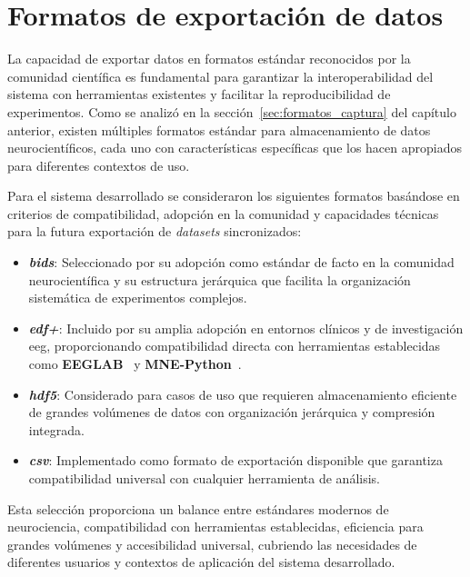 \section{Formatos de exportación de datos}
\label{sec:formatos_exportacion}

La capacidad de exportar datos en formatos estándar reconocidos por la comunidad científica es fundamental para garantizar la interoperabilidad del sistema con herramientas existentes y facilitar la reproducibilidad de experimentos. Como se analizó en la sección~\ref{sec:formatos_captura} del capítulo anterior, existen múltiples formatos estándar para almacenamiento de datos neurocientíficos, cada uno con características específicas que los hacen apropiados para diferentes contextos de uso.

Para el sistema desarrollado se consideraron los siguientes formatos basándose en criterios de compatibilidad, adopción en la comunidad y capacidades técnicas para la futura exportación de \textit{\glspl{dataset}} sincronizados:

\begin{itemize}
    \item \textbf{\textit{\acrfull{bids}}}: Seleccionado por su adopción como estándar de facto en la comunidad neurocientífica y su estructura jerárquica que facilita la organización sistemática de experimentos complejos.
    
    \item \textbf{\textit{\acrfull{edf+}}}: Incluido por su amplia adopción en entornos clínicos y de investigación \acrshort{eeg}, proporcionando compatibilidad directa con herramientas establecidas como \textbf{EEGLAB}~\cite{delorme2004eeglab} y \textbf{MNE-Python}~\cite{gramfort2013meg}.
    
    \item \textbf{\textit{\acrfull{hdf5}}}: Considerado para casos de uso que requieren almacenamiento eficiente de grandes volúmenes de datos con organización jerárquica y compresión integrada.
    
    \item \textbf{\textit{\acrfull{csv}}}: Implementado como formato de exportación disponible que garantiza compatibilidad universal con cualquier herramienta de análisis.
\end{itemize}

Esta selección proporciona un balance entre estándares modernos de neurociencia, compatibilidad con herramientas establecidas, eficiencia para grandes volúmenes y accesibilidad universal, cubriendo las necesidades de diferentes usuarios y contextos de aplicación del sistema desarrollado.

